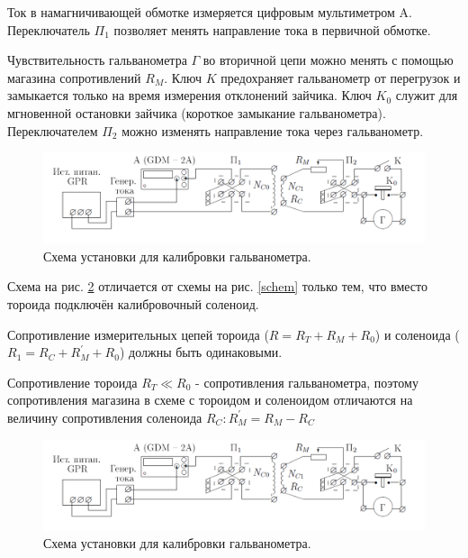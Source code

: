 \documentclass[a4paper, 12pt, twoside]{article}
\begin{document}
Ток в намагничивающей обмотке измеряется цифровым мультиметром A. Переключатель $\Pi_1$ позволяет менять направление тока в первичной обмотке.

Чувствительность гальванометра $\Gamma$ во вторичной цепи можно менять с помощью магазина сопротивлений $R_M$. Ключ $K$ предохраняет гальванометр от перегрузок и замыкается только на время измерения отклонений зайчика. Ключ $K_0$ служит для мгновенной остановки зайчика (короткое замыкание гальванометра). Переключателем $\Pi_2$ можно изменять направление тока через гальванометр.

\begin{figure}[H]
	\centering
	\includegraphics[width = \textwidth]{schem2}
	\caption{Схема установки для калибровки гальванометра.}
	\label{schem2}
\end{figure}

Схема на рис. \ref{schem2} отличается от схемы на рис. \ref{schem} только тем, что вместо тороида подключён калибровочный соленоид.

Сопротивление измерительных цепей тороида ($R = R_T+R_M+R_0$) и соленоида ($R_1 = R_C + R^{'}_M+R_0$) должны быть одинаковыми.

Сопротивление тороида $R_T \ll R_0$ - сопротивления гальванометра, поэтому сопротивления магазина в схеме с тороидом и соленоидом отличаются на величину сопротивления соленоида  $R_C: R^{'}_M = R_M - R_C$
\begin{figure}[H]
	\centering
	\includegraphics[width = \textwidth]{schem2}
	\caption{Схема установки для калибровки гальванометра.}
	\label{schem2}
\end{figure}
\end{document}
